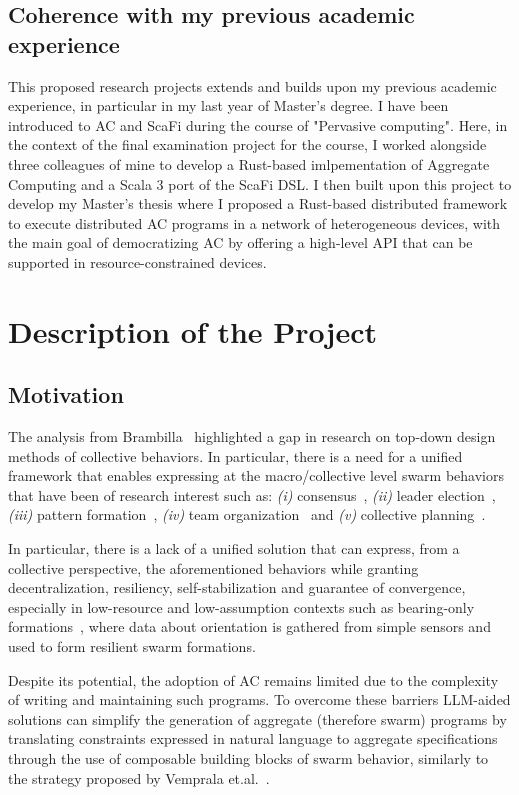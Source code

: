 \documentclass[12pt]{article}
\begin{document}
\subsection{Coherence with my previous academic experience}
\label{sec:coherence}
This proposed research projects extends and builds upon my previous academic experience, in particular in my last year of Master's degree.
I have been introduced to AC and ScaFi during the course of "Pervasive computing". Here, in the context of the final examination project for the course,
I worked alongside three colleagues of mine to develop a Rust-based imlpementation of Aggregate Computing and a Scala 3 port of the ScaFi DSL.
I then built upon this project to develop my Master's thesis where I proposed a Rust-based distributed framework to execute distributed AC programs in a network of
heterogeneous devices, with the main goal of democratizing AC by offering a high-level API that can be supported in resource-constrained devices.

\section{Description of the Project}
\subsection{Motivation}
The analysis from Brambilla~\cite{brambilla2013swarm} highlighted a gap in research on top-down design methods of collective behaviors.
In particular, there is a need for a unified framework that enables expressing at the macro/collective level swarm behaviors that have
been of research interest such as:
\textit{(i)} consensus~\cite{valentini2017achieving}, \textit{(ii)} leader election~\cite{karpov2015leader}, \textit{(iii)} pattern formation~\cite{sahin2002swarm},
\textit{(iv)} team organization~\cite{nouyan2009teamwork} and \textit{(v)} collective planning~\cite{sampedro2016flexible}.

In particular, there is a lack of a unified solution that can express, from a collective perspective, the aforementioned behaviors while granting decentralization, 
resiliency, self-stabilization and guarantee of convergence, especially in low-resource and low-assumption contexts such as
bearing-only formations~\cite{zhao2021bearing}, where data about orientation is gathered from simple sensors and used to form resilient swarm formations.

Despite its potential, the adoption of AC remains limited due to the complexity of writing and maintaining such programs. To overcome these barriers
LLM-aided solutions can simplify the generation of aggregate (therefore swarm) programs by translating constraints expressed in natural language to aggregate specifications
through the use of composable building blocks of swarm behavior, similarly to the strategy proposed by Vemprala et.al.~\cite{vemprala2024chatgpt}.
\end{document}
